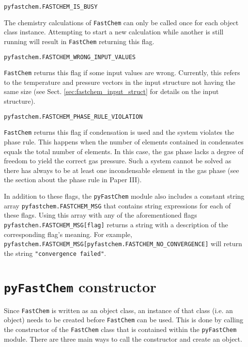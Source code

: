 \documentclass[numbers=noenddot]{aux/fcmanual}
\newcommand{\fc}{\texttt{FastChem}\xspace}
\newcommand{\pfc}{\texttt{pyFastChem}\xspace}
\begin{document}
\bigbreak
      
\lstinline!pyfastchem.FASTCHEM_IS_BUSY!
\begin{addmargin}[25pt]{0pt}
  The chemistry calculations of \fc can only be called once for each object class instance. Attempting to start a new calculation while another is still running will result in \fc returning this flag.
\end{addmargin}
        
\bigbreak
        
\lstinline!pyfastchem.FASTCHEM_WRONG_INPUT_VALUES!
\begin{addmargin}[25pt]{0pt}
  \fc returns this flag if some input values are wrong. Currently, this refers to the temperature and pressure vectors in the input structure not having the same size (see Sect. \ref{sec:fastchem_input_struct} for details on the input structure).
\end{addmargin}

\bigbreak

\lstinline!pyfastchem.FASTCHEM_PHASE_RULE_VIOLATION!
\begin{addmargin}[25pt]{0pt}
	\fc returns this flag if condensation is used and the system violates the phase rule. This happens when the number of elements contained in condensates equals the total number of elements. In this case, the gas phase lacks a degree of freedom to yield the correct gas pressure. Such a system cannot be solved as there has always to be at least one incondensable element in the gas phase (see the section about the phase rule in Paper III). \\
\end{addmargin}

\bigbreak
          
In addition to these flags, the \pfc module also includes a constant string array \lstinline!pyfastchem.FASTCHEM_MSG! that contains string expressions for each of these flags. Using this array with any of the aforementioned flags \lstinline!pyfastchen.FASTCHEM_MSG[flag]! returns a string with a description of the corresponding flag's meaning. For example, \lstinline!pyfastchem.FASTCHEM_MSG[pyfastchem.FASTCHEM_NO_CONVERGENCE]! will return the string \lstinline!"convergence failed"!.


\section{\pfc constructor}

Since \fc is written as an object class, an instance of that class (i.e. an object) needs to be created before \fc can be used. This is done by calling the constructor of the \fc class that is contained within the \pfc module. There are three main ways to call the constructor and create an object.\\
\end{document}

